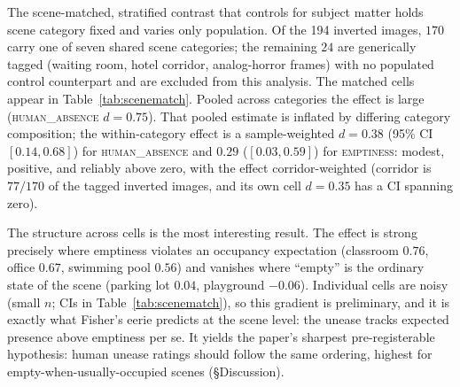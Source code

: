 \documentclass[11pt]{article}
\begin{document}
The scene-matched, stratified contrast that controls
for subject matter holds scene category fixed and varies only population. Of the 194
inverted images, $170$ carry one of seven shared scene categories; the remaining $24$ are
generically tagged (waiting room, hotel corridor, analog-horror frames) with no populated
control counterpart and are excluded from this analysis. The matched cells appear in
Table~\ref{tab:scenematch}. Pooled across categories the effect is large
(\textsc{human\_absence} $d=0.75$). That pooled estimate is inflated by differing category
composition; the within-category effect is a sample-weighted $d=0.38$ (95\%
CI $[0.14,0.68]$) for \textsc{human\_absence} and $0.29$ ($[0.03,0.59]$) for
\textsc{emptiness}: modest,
positive, and reliably above zero, with the effect corridor-weighted (corridor is $77/170$ of the
tagged inverted images, and its own cell $d=0.35$ has a CI spanning zero).

The structure across cells is the most interesting result. The effect is strong
precisely where emptiness violates an occupancy expectation (classroom $0.76$, office
$0.67$, swimming pool $0.56$) and vanishes where ``empty'' is the ordinary state of
the scene (parking lot $0.04$, playground $-0.06$). Individual cells are noisy (small
$n$; CIs in Table~\ref{tab:scenematch}), so this gradient is preliminary, and it is
exactly what Fisher's eerie predicts at the scene level: the
unease tracks expected presence above emptiness per se. It yields the paper's sharpest
pre-registerable hypothesis: human unease ratings should follow the same ordering,
highest for empty-when-usually-occupied scenes (\S Discussion).
\end{document}
